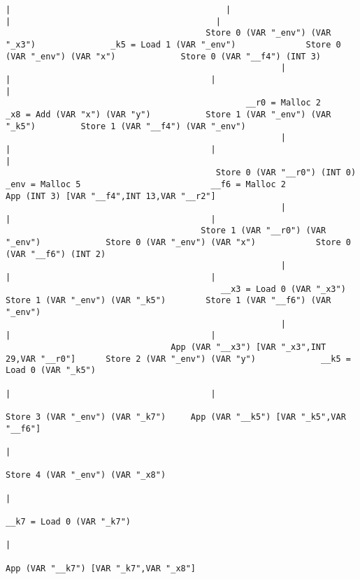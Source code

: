 \begin{landscape}
\begin{lstlisting}[basicstyle=\fontsize{6}{7.5}\selectfont\ttfamily]
                                                       |                                           |                                        |                                         |
                                        Store 0 (VAR "_env") (VAR "_x3")               _k5 = Load 1 (VAR "_env")              Store 0 (VAR "_env") (VAR "x")             Store 0 (VAR "__f4") (INT 3)
                                                       |                                           |                                        |                                         |
                                                __r0 = Malloc 2                      _x8 = Add (VAR "x") (VAR "y")           Store 1 (VAR "_env") (VAR "_k5")         Store 1 (VAR "__f4") (VAR "_env")
                                                       |                                           |                                        |                                         |
                                          Store 0 (VAR "__r0") (INT 0)                      _env = Malloc 5                          __f6 = Malloc 2              App (INT 3) [VAR "__f4",INT 13,VAR "__r2"]
                                                       |                                           |                                        |
                                       Store 1 (VAR "__r0") (VAR "_env")             Store 0 (VAR "_env") (VAR "x")            Store 0 (VAR "__f6") (INT 2)
                                                       |                                           |                                        |
                                           __x3 = Load 0 (VAR "_x3")                Store 1 (VAR "_env") (VAR "_k5")        Store 1 (VAR "__f6") (VAR "_env")
                                                       |                                           |                                        |
                                 App (VAR "__x3") [VAR "_x3",INT 29,VAR "__r0"]      Store 2 (VAR "_env") (VAR "y")             __k5 = Load 0 (VAR "_k5")
                                                                                                   |                                        |
                                                                                    Store 3 (VAR "_env") (VAR "_k7")     App (VAR "__k5") [VAR "_k5",VAR "__f6"]
                                                                                                   |
                                                                                    Store 4 (VAR "_env") (VAR "_x8")
                                                                                                   |
                                                                                       __k7 = Load 0 (VAR "_k7")
                                                                                                   |
                                                                                 App (VAR "__k7") [VAR "_k7",VAR "_x8"]

\end{lstlisting}
\end{landscape}
\clearpage

